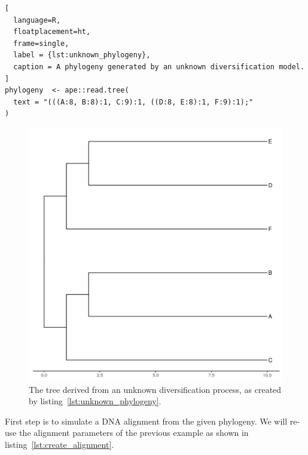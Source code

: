 \documentclass{article}
\begin{document}
\begin{lstlisting}[
  language=R, 
  floatplacement=ht, 
  frame=single, 
  label = {lst:unknown_phylogeny},
  caption = A phylogeny generated by an unknown diversification model.
]
phylogeny  <- ape::read.tree(
  text = "(((A:8, B:8):1, C:9):1, ((D:8, E:8):1, F:9):1);"
)
\end{lstlisting}
\begin{figure}[ht]
  \includegraphics[width=\textwidth]{example_2/tree_unknown.png}
  \caption{The tree derived from an unknown diversification process, 
    as created by listing~\ref{lst:unknown_phylogeny}.
  }
\end{figure}

First step is to simulate a DNA alignment from the 
given phylogeny. 
We will re-use the alignment parameters of the previous example 
as shown in listing~\ref{lst:create_alignment}.
\end{document}
